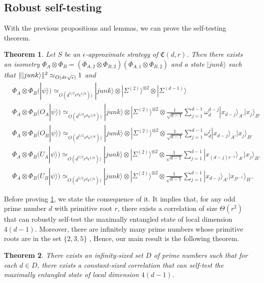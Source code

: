 \documentclass[11pt,letterpaper]{article}
\newcommand{\ket}[1]{|#1\rangle}
\newcommand{\x}{\otimes}
\DeclarePairedDelimiter{\norm}{\lVert}{\rVert}
\newcommand{\1}{\mathbb{1}}
\newcommand{\EPR}[1]{\Sigma^{(#1)}}
\newcommand{\fC}{\mathfrak{C}}
\newcommand{\ep}{\epsilon}
\newcommand{\se}{\sqrt{\epsilon}}
\newcommand{\appd}[1]{\simeq_{#1}}
\newtheorem{theorem}{Theorem}[section]
\theoremstyle{definition}
\begin{document}
\subsection{Robust self-testing}
\label{sec:self-test}
With the previous propositions and lemmas, we can prove the self-testing theorem.
\begin{theorem}
	\label{thm:self-test}
	Let $S$ be an $\ep$-approximate strategy of $\fC(d,r)$.
	Then there exists an isometry   
	$\Phi_A \x \Phi_B = (\Phi_{A,2} \x \Phi_{B,2})(\Phi_{A,1}\x\Phi_{B,2})$ and a state $\ket{junk}$
	such that $\norm{\ket{junk}}^2 \appd{O(dr\se)} 1$ and 
	\begin{align}
		&\Phi_A \x \Phi_B (\ket{\psi}) \appd{O(d^{5/2} r^{d} \ep^{1/8}))} \ket{junk} \x \ket{\EPR{2}}^{\x 2} \x \ket{\EPR{d-1}}\\	
		&\Phi_A \x \Phi_B (O_A\ket{\psi}) \appd{O(d^{5/2} r^{d}\ep^{1/8}))} \ket{junk} \x \ket{\EPR{2}}^{\x 2} \x
		\frac{1}{\sqrt{d-1}}\sum_{j=1}^{d-1} \omega_d^{d-j}\ket{x_{d-j}}_{A'}\ket{x_j}_{B'} \\
		&\Phi_A \x \Phi_B (O_B\ket{\psi}) \appd{O(d^{5/2}r^{d} \ep^{1/8}))} \ket{junk} \x \ket{\EPR{2}}^{\x 2} \x
		\frac{1}{\sqrt{d-1}}\sum_{j=1}^{d-1} \omega_d^{j}\ket{x_{d-j}}_{A'}\ket{x_j}_{B'}\\
		&\Phi_A \x \Phi_B (U_A\ket{\psi}) \appd{O(d^{5/2} r^{d}  \ep^{1/8}))} \ket{junk} \x \ket{\EPR{2}}^{\x 2} \x
		\frac{1}{\sqrt{d-1}}\sum_{j=1}^{d-1} \ket{x_{(d-j)r^{-1}}}_{A'}\ket{x_j}_{B'} \\
		&\Phi_A \x \Phi_B (U_B\ket{\psi}) \appd{O(d^{5/2} r^{d}\ep^{1/8}))} \ket{junk} \x \ket{\EPR{2}}^{\x 2} \x
		\frac{1}{\sqrt{d-1}}\sum_{j=1}^{d-1} \ket{x_{d-j}}_{A'}\ket{x_{j r^{-1}}}_{B'}.
	\end{align}
\end{theorem}
Before proving \cref{thm:self-test}, we state the consequence of it.
It implies that,
for any odd prime number $d$ with primitive root $r$, 
there exists a correlation of size $\Theta(r^2)$ that can robustly self-test the maximally
entangled state of local dimension $4(d-1)$.
Moreover, there are infinitely many prime numbers
whose primitive roots are in the set $\{2,3,5\}$ \cite{murty1988},
Hence, our main result is the following theorem.
\begin{theorem}
	\label{thm:infty}
	There exists an infinity-sized set $D$ of prime numbers such that 
	for each $d \in D$, there exists
	a constant-sized correlation that can self-test the maximally entangled state
	of local dimension $4(d-1)$.
\end{theorem}
\end{document}
